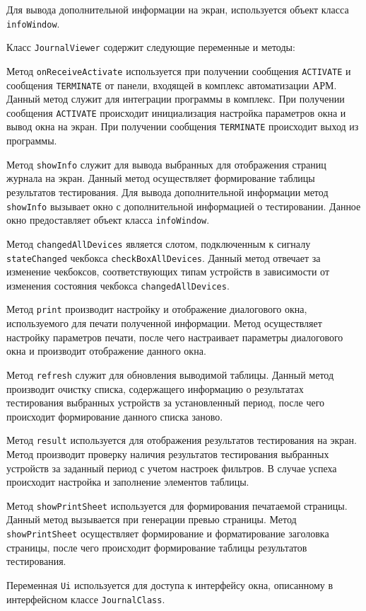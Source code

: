 Для вывода дополнительной информации на экран, используется объект класса \texttt{infoWindow}.

Класс \texttt{JournalViewer} содержит следующие переменные и методы:
\begin{enum}
	\item Метод \texttt{onReceiveActivate} используется при получении сообщения \texttt{ACTIVATE} и сообщения \texttt{TERMINATE} от
		панели, входящей в комплекс автоматизации АРМ. Данный метод служит для интеграции программы в комплекс. При
		получении сообщения \texttt{ACTIVATE} происходит инициализация настройка параметров окна и вывод окна на экран.
		При получении сообщения \texttt{TERMINATE} происходит выход из программы.
	\item Метод \texttt{showInfo} служит для вывода выбранных для отображения страниц журнала на экран. Данный метод
		осуществляет формирование таблицы результатов тестирования. Для вывода дополнительной информации метод
		\texttt{showInfo} вызывает окно с дополнительной информацией о тестировании. Данное окно предоставляет
		объект класса \texttt{infoWindow}.
	\item Метод \texttt{changedAllDevices} является слотом, подключенным к сигналу \texttt{stateChanged} чекбокса
		\texttt{checkBoxAllDevices}. Данный метод отвечает за изменение чекбоксов, соответствующих типам
		устройств в зависимости от изменения состояния чекбокса \texttt{changedAllDevices}.
	\item Метод \texttt{print} производит настройку и отображение диалогового окна, используемого для печати
		полученной информации. Метод осуществляет настройку параметров печати, после чего настраивает параметры
		диалогового окна и производит отображение данного окна.
	\item Метод \texttt{refresh} служит для обновления выводимой таблицы. Данный метод производит очистку списка,
		содержащего информацию о результатах тестирования выбранных устройств за установленный период, после
		чего происходит формирование данного списка заново.
	\item Метод \texttt{result} используется для отображения результатов тестирования на экран. Метод производит
		проверку наличия результатов тестирования выбранных устройств за заданный период с учетом настроек
		фильтров. В случае успеха происходит настройка и заполнение элементов таблицы.
	\item Метод \texttt{showPrintSheet} используется для формирования печатаемой страницы. Данный метод вызывается
		при генерации превью страницы. Метод \texttt{showPrintSheet} осуществляет формирование и форматирование заголовка
		страницы, после чего происходит формирование таблицы результатов тестирования.
	\item Переменная \texttt{Ui} используется для доступа к интерфейсу окна, описанному в интерфейсном классе
		\texttt{JournalClass}.
\end{enum}

